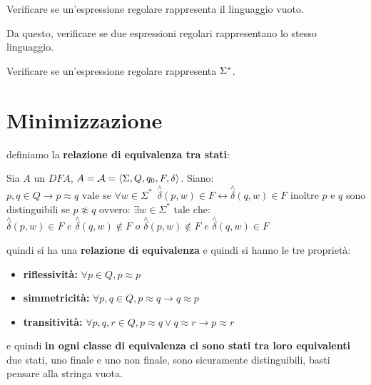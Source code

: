 Verificare se un'espressione regolare rappresenta il linguaggio vuoto.

Da questo, verificare se due espressioni regolari rappresentano lo stesso linguaggio.

Verificare se un'espressione regolare rappresenta $\Sigma{}^{\ast}$.


\section{Minimizzazione}
definiamo la \textbf{relazione di equivalenza tra stati}:
\begin{definition}
	Sia $A$ un $DFA$, $A=\mathcal{A}=\langle \Sigma, Q, q_{0}, F, \delta \rangle$. Siano:
	$p,q\in Q\to p\approx q\text{ vale se } \forall w \in \Sigma^*\,\,\, \stackrel{\wedge}{\delta}(p,w)\in F\longleftrightarrow \stackrel{\wedge}{\delta}(q,w)\in F$
	inoltre $p$ e $q$ sono distinguibili se $p\not\approx q$ ovvero:
	$\exists w\in \Sigma^*\text{ tale che:} $
	$\stackrel{\wedge}{\delta}(p,w)\in F \,\,e\,\,\stackrel{\wedge}{\delta}(q,w)\not\in F\,\,o\,\,\stackrel{\wedge}{\delta}(p,w)\not\in F \,\,e\,\,\stackrel{\wedge}{\delta}(q,w)\in F$
\end{definition}
quindi si ha una \textbf{relazione di equivalenza} e quindi si hanno le tre proprietà:
\begin{itemize}
	\item \textbf{riflessività:} $\forall p\in Q, p\approx p$
	\item \textbf{simmetricità:} $\forall p,q\in Q, p\approx q\to q\approx p$
	\item \textbf{transitività:} $\forall p,q,r\in Q, p\approx q\vee q\approx r\to p\approx r$
\end{itemize}
e quindi \textbf{in ogni classe di equivalenza ci sono stati tra loro equivalenti}
due stati, uno finale e uno non finale, sono sicuramente distinguibili, basti pensare alla stringa vuota.
